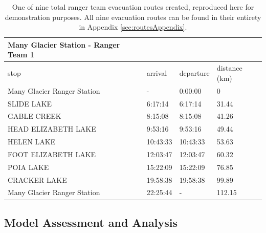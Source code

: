 \documentclass[12pt]{article}
\begin{document}
\begin{table}
\caption{One of nine total ranger team evacuation routes created, reproduced here for demonstration purposes. All nine evacuation routes can be found in their entirety in Appendix \ref{sec:routesAppendix}.}
\begin{tabular}{@{}llll@{}}
\toprule
Many Glacier Station - Ranger Team 1 &          &           &               \\ \midrule
stop                    & arrival  & departure & distance (km) \\
Many Glacier Ranger Station & -        & 0:00:00   & 0             \\
SLIDE LAKE              & 6:17:14  & 6:17:14   & 31.44         \\
GABLE CREEK             & 8:15:08  & 8:15:08   & 41.26         \\
HEAD ELIZABETH LAKE     & 9:53:16  & 9:53:16   & 49.44         \\
HELEN LAKE              & 10:43:33 & 10:43:33  & 53.63         \\
FOOT ELIZABETH LAKE     & 12:03:47 & 12:03:47  & 60.32         \\
POIA LAKE               & 15:22:09 & 15:22:09  & 76.85         \\
CRACKER LAKE         & 19:58:38 & 19:58:38  & 99.89         \\
Many Glacier Ranger Station & 22:25:44 & -         & 112.15        \\ \bottomrule
\end{tabular}
\label{table:manyGlacier1Table}
\end{table}

\newpage
\subsection{Model Assessment and Analysis}
\end{document}
